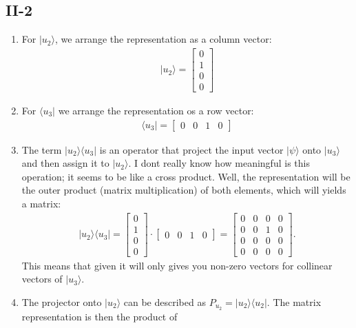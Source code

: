 \documentclass[letterpaper,11pt,twoside]{article}
\newcommand{\ket}[1]{|#1\rangle}
\newcommand{\bra}[1]{\langle#1|}
\begin{document}
  \subsection*{II-2}
  \begin{enumerate}[itemsep=0pt,topsep=0pt,label=(\alph*)]
    \item For $\ket{u_2}$, we arrange the representation as a column vector:
    \begin{align*}
      \ket{u_2}=\begin{bmatrix}
          0\\1\\0\\0
      \end{bmatrix}
    \end{align*}
    \item For $\bra{u_3}$ we arrange the representation os a row vector:
    \begin{align*}
      \bra{u_3}=\begin{bmatrix}
          0&0&1&0
      \end{bmatrix}
    \end{align*}
    \item The term $\ket{u_2}\bra{u_3}$ is an operator that project the input vector $\ket{\psi}$ onto $\ket{u_3}$ and then assign it to $\ket{u_2}$. I dont really know
    how meaningful is this operation; it seems to be like a cross product. Well, the representation will be the outer product (matrix multiplication) of both elements, which 
    will yields a matrix:
    \begin{align*}
      \ket{u_2}\bra{u_3}=\begin{bmatrix}
          0\\1\\0\\0
      \end{bmatrix}\cdot\begin{bmatrix}
          0&0&1&0
      \end{bmatrix}=\begin{bmatrix}
        0&0&0&0\\
        0&0&1&0\\
        0&0&0&0\\
        0&0&0&0
      \end{bmatrix}.
    \end{align*} 
    This means that given it will only gives you non-zero vectors for collinear vectors of $\ket{u_3}$.
    \item The projector onto $\ket{u_2}$ can be described as $P_{u_2}=\ket{u_2}{\bra{u_2}}$. The matrix representation is then the product of 

\end{enumerate}
\end{document}
